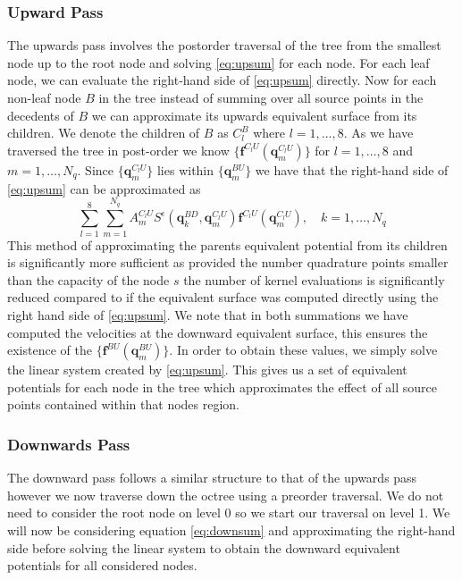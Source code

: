 \subsubsection{Upward Pass}
The upwards pass involves the postorder traversal of the tree from the smallest node up to the root node and solving \cref{eq:upsum} for each node. For each leaf node, we can evaluate the right-hand side of \cref{eq:upsum} directly. Now for each non-leaf node $B$ in the tree instead of summing over all source points in the decedents of $B$ we can approximate its upwards equivalent surface from its children. We denote the children of $B$ as $C_l^B$ where $l=1,...,8$. As we have traversed the tree in post-order we know $\{\mathbf{f}^{C_l U}(\mathbf{q}^{C_lU}_m)\}$ for $l=1,\dots,8$ and $m=1,\dots,N_q$. Since $\{\mathbf{q}^{C_lU}_m\}$ lies within $\{\mathbf{q}^{BU}_m\}$ we have that the right-hand side of \cref{eq:upsum} can be approximated as 
\begin{equation}
\label{eq:M2M}
    \sum_{l=1}^{8} \sum_{m=1}^{N_{q}} A_{m}^{C_{l} U} S^\epsilon\left(\mathbf{q}_{k}^{B D}, \mathbf{q}_{m}^{C_{l} U}\right) \mathbf{f}^{C_{l} U}\left(\mathbf{q}_{m}^{C_{l} U}\right), \quad k=1,\dots,N_q
\end{equation}
This method of approximating the parents equivalent potential from its children is significantly more sufficient as provided the number quadrature points smaller than the capacity of the node $s$ the number of kernel evaluations is significantly reduced compared to if the equivalent surface was computed directly using the right hand side of \cref{eq:upsum}. We note that in both summations we have computed the velocities at the downward equivalent surface, this ensures the existence of the $\{\mathbf{f}^{BU}(\mathbf{q}^{BU}_m)\}$. In order to obtain these values, we simply solve the linear system created by \cref{eq:upsum}. This gives us a set of equivalent potentials for each node in the tree which approximates the effect of all source points contained within that nodes region. 

\subsubsection{Downwards Pass}
The downward pass follows a similar structure to that of the upwards pass however we now traverse down the octree using a preorder traversal. We do not need to consider the root node on level 0 so we start our traversal on level 1. We will now be considering equation \cref{eq:downsum} and approximating the right-hand side before solving the linear system to obtain the downward equivalent potentials for all considered nodes. 

